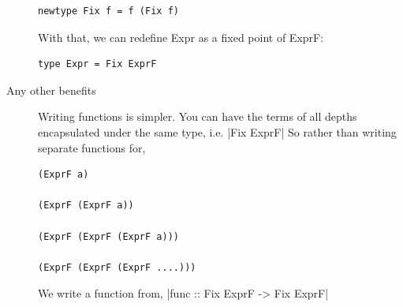 \documentclass[thesis-solanki.tex]{subfiles}
\begin{document}
\begin{description}
\begin{verbatim}
newtype Fix f = f (Fix f)
\end{verbatim}
With that, we can redefine Expr as a fixed point of ExprF:
\begin{verbatim}
type Expr = Fix ExprF
\end{verbatim}

\item[Any other benefits]
Writing functions is simpler. You can have the terms of all depths encapsulated under the same type, i.e.
|Fix ExprF|
So rather than writing separate functions for,
\begin{verbatim}
(ExprF a)

(ExprF (ExprF a))

(ExprF (ExprF (ExprF a)))

(ExprF (ExprF (ExprF ....)))
\end{verbatim}

We write a function from,
|func :: Fix ExprF -> Fix ExprF|

\end{description}
\end{document}
